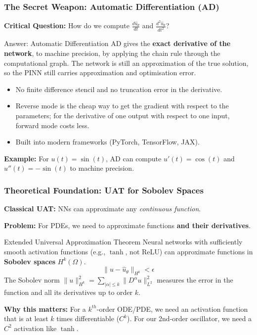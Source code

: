 \documentclass[notes]{beamer}
\begin{document}
\begin{frame}
\frametitle{The Secret Weapon: Automatic Differentiation (AD)}

\textbf{Critical Question:} How do we compute $\frac{d\hat{u}_\theta}{dt}$ and $\frac{d^2\hat{u}_\theta}{dt^2}$?

\begin{alertblock}{Answer: Automatic Differentiation}
AD gives the \textbf{exact derivative of the network}, to machine precision, by applying the chain rule through the computational graph. The network is still an approximation of the true solution, so the PINN still carries approximation and optimisation error.
\begin{itemize}
    \item No finite difference stencil and no truncation error in the derivative.
    \item Reverse mode is the cheap way to get the gradient with respect to the parameters; for the derivative of one output with respect to one input, forward mode costs less.
    \item Built into modern frameworks (PyTorch, TensorFlow, JAX).
\end{itemize}
\end{alertblock}

\textbf{Example:} For $u(t) = \sin(t)$, AD can compute $u'(t)=\cos(t)$ and $u''(t)=-\sin(t)$ to machine precision.

\end{frame}

\begin{frame}
\frametitle{Theoretical Foundation: UAT for Sobolev Spaces}

\textbf{Classical UAT:} NNs can approximate any \textit{continuous function}.

\textbf{Problem:} For PDEs, we need to approximate functions \textbf{and their derivatives}.

\begin{block}{Extended Universal Approximation Theorem}
Neural networks with sufficiently smooth activation functions (e.g., $\tanh$, not ReLU) can approximate functions in \textbf{Sobolev spaces} $H^k(\Omega)$.
\begin{equation*}
\|u - \hat{u}_\theta\|_{H^k} < \epsilon
\end{equation*}
The Sobolev norm $\|u\|_{H^k}^2 = \sum_{|\alpha| \leq k} \|D^\alpha u\|_{L^2}^2$ measures the error in the function and all its derivatives up to order $k$.
\end{block}

\textbf{Why this matters:} For a $k^{th}$-order ODE/PDE, we need an activation function that is at least $k$ times differentiable ($C^k$). For our 2nd-order oscillator, we need a $C^2$ activation like $\tanh$.

\end{frame}
\end{document}
